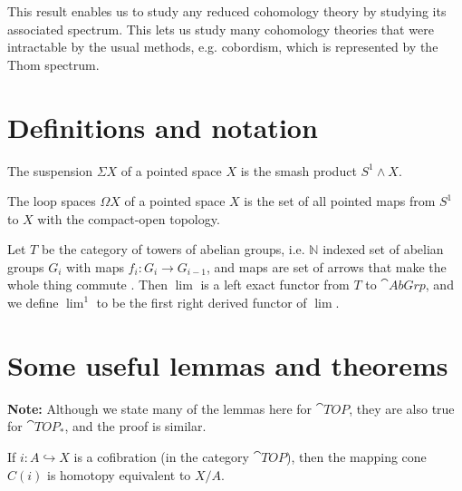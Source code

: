 This result enables us to study any reduced cohomology theory by studying its associated spectrum.
This lets us study many cohomology theories that were intractable by the usual methods, e.g.
cobordism, which is represented by the Thom spectrum.

\newpage

\appendix

\section{Definitions and notation}
\label{sec:definitions-notation}

\begin{defn}
  The suspension $\Sigma X$ of a pointed space $X$ is the smash product $S^1 \wedge X$.
\end{defn}

\begin{defn}
  The loop spaces $\Omega X$ of a pointed space $X$ is the set of all pointed maps from $S^1$ to $X$
  with the compact-open topology.
\end{defn}

\begin{defn}[$\lim^1$]
  Let $T$ be the category of towers of abelian groups, i.e. $\mathbb{N}$ indexed set of abelian
  groups $G_i$ with maps $f_i: G_i \to G_{i-1}$, and maps are set of arrows that make the whole
  thing commute . Then $\lim$ is a
  left exact functor from $T$ to $\cat{AbGrp}$, and we define $\lim^1$ to be the first right derived
  functor of $\lim$.
\end{defn}

\section{Some useful lemmas and theorems}
\label{sec:some-useful-lemmas}

\textbf{Note:} Although we state many of the lemmas here for $\cat{TOP}$, they are also true for
$\cat{TOP}_{\ast}$, and the proof is similar.

\begin{lem}
  If $i: A \hookrightarrow X$ is a cofibration (in the category $\cat{TOP}$), then the mapping cone
  $C(i)$ is homotopy equivalent to $X/A$.
\end{lem}

